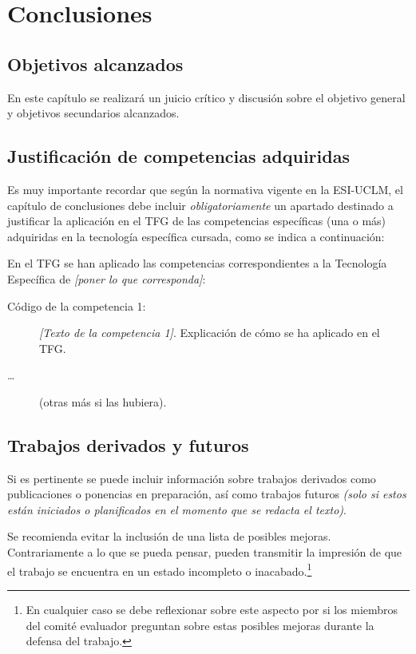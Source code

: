\chapter{Conclusiones}
\label{cap:Conclusiones}




\section{Objetivos alcanzados}
En este capítulo se realizará un juicio crítico y discusión sobre el objetivo general y objetivos secundarios alcanzados. 





\section{Justificación de competencias adquiridas}
Es muy importante recordar que según la normativa vigente en la ESI-UCLM, el capítulo de conclusiones debe incluir \emph{obligatoriamente} un apartado destinado a justificar la aplicación en el TFG de las competencias específicas (una o más) adquiridas en la tecnología específica cursada, como se indica a continuación:

En el TFG se han aplicado las competencias correspondientes a la Tecnología Específica de \emph{[poner lo que corresponda]}:

\begin{description}
\item[Código de la competencia 1:] \emph{[Texto de la competencia 1]}. Explicación de cómo se ha aplicado en el TFG.
\item[\dots] (otras más si las hubiera).
\end{description}




\section{Trabajos derivados y futuros}
Si es pertinente se puede incluir información sobre trabajos derivados como publicaciones o ponencias en preparación, así como trabajos futuros \emph{(solo si estos están iniciados o planificados en el momento que se redacta el texto)}.

Se recomienda evitar la inclusión de una lista de posibles mejoras. Contrariamente a lo que se pueda pensar, pueden transmitir la impresión de que el trabajo se encuentra en un estado incompleto o inacabado.\footnote{En cualquier caso se debe reflexionar sobre este aspecto por si los miembros del comité evaluador preguntan sobre estas posibles mejoras durante la defensa del trabajo.}




